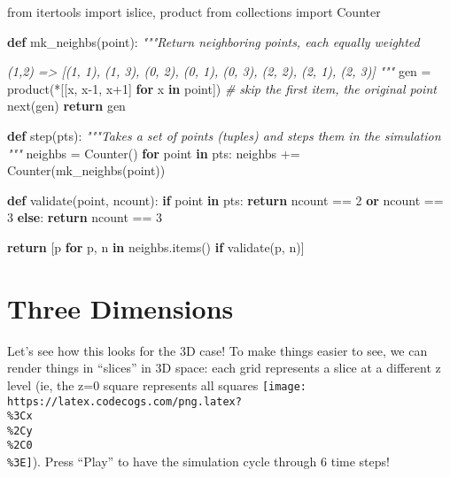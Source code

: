 \documentclass[]{article}
\newenvironment{Shaded}{}{}
\newcommand{\BuiltInTok}[1]{#1}
\newcommand{\CommentTok}[1]{\textcolor[rgb]{0.38,0.63,0.69}{\textit{#1}}}
\newcommand{\ControlFlowTok}[1]{\textcolor[rgb]{0.00,0.44,0.13}{\textbf{#1}}}
\newcommand{\DecValTok}[1]{\textcolor[rgb]{0.25,0.63,0.44}{#1}}
\newcommand{\ImportTok}[1]{#1}
\newcommand{\KeywordTok}[1]{\textcolor[rgb]{0.00,0.44,0.13}{\textbf{#1}}}
\newcommand{\NormalTok}[1]{#1}
\newcommand{\OperatorTok}[1]{\textcolor[rgb]{0.40,0.40,0.40}{#1}}
\begin{document}
\begin{Shaded}
\begin{Highlighting}[]
\ImportTok{from}\NormalTok{ itertools }\ImportTok{import}\NormalTok{ islice, product}
\ImportTok{from}\NormalTok{ collections }\ImportTok{import}\NormalTok{ Counter}

\KeywordTok{def}\NormalTok{ mk\_neighbs(point):}
    \CommentTok{"""Return neighboring points, each equally weighted}

\CommentTok{    (1,2)}
\CommentTok{    => [(1, 1), (1, 3), (0, 2), (0, 1), (0, 3), (2, 2), (2, 1), (2, 3)]}
\CommentTok{    """}
\NormalTok{    gen }\OperatorTok{=}\NormalTok{ product(}\OperatorTok{*}\NormalTok{[[x, x}\DecValTok{{-}1}\NormalTok{, x}\OperatorTok{+}\DecValTok{1}\NormalTok{] }\ControlFlowTok{for}\NormalTok{ x }\KeywordTok{in}\NormalTok{ point])}
    \CommentTok{\# skip the first item, the original point}
    \BuiltInTok{next}\NormalTok{(gen)}
    \ControlFlowTok{return}\NormalTok{ gen}

\KeywordTok{def}\NormalTok{ step(pts):}
    \CommentTok{"""Takes a set of points (tuples) and steps them in the simulation}
\CommentTok{    """}
\NormalTok{    neighbs }\OperatorTok{=}\NormalTok{ Counter()}
    \ControlFlowTok{for}\NormalTok{ point }\KeywordTok{in}\NormalTok{ pts:}
\NormalTok{        neighbs }\OperatorTok{+=}\NormalTok{ Counter(mk\_neighbs(point))}

    \KeywordTok{def}\NormalTok{ validate(point, ncount):}
        \ControlFlowTok{if}\NormalTok{ point }\KeywordTok{in}\NormalTok{ pts:}
            \ControlFlowTok{return}\NormalTok{ ncount }\OperatorTok{==} \DecValTok{2} \KeywordTok{or}\NormalTok{ ncount }\OperatorTok{==} \DecValTok{3}
        \ControlFlowTok{else}\NormalTok{:}
            \ControlFlowTok{return}\NormalTok{ ncount }\OperatorTok{==} \DecValTok{3}

    \ControlFlowTok{return}\NormalTok{ [p }\ControlFlowTok{for}\NormalTok{ p, n }\KeywordTok{in}\NormalTok{ neighbs.items() }\ControlFlowTok{if}\NormalTok{ validate(p, n)]}
\end{Highlighting}
\end{Shaded}

\hypertarget{three-dimensions}{%
\section{Three Dimensions}\label{three-dimensions}}

Let's see how this looks for the 3D case! To make things easier to see, we can
render things in ``slices'' in 3D space: each grid represents a slice at a
different z level (ie, the z=0 square represents all squares
\texttt{[image: https://latex.codecogs.com/png.latex?\\\%3Cx\\\%2Cy\\\%2C0\\\%3E]}).
Press ``Play'' to have the simulation cycle through 6 time steps!
\end{document}
